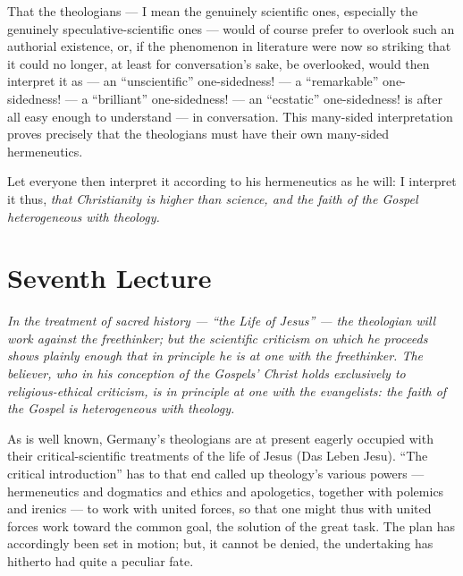 \documentclass[12pt,a4paper]{book}
\begin{document}
That the theologians --- I mean the genuinely scientific ones, especially the genuinely
speculative-scientific ones --- would of course prefer to overlook such an authorial
existence, or, if the phenomenon in literature were now so striking that it could no
longer, at least for conversation's sake, be overlooked, would then interpret it as --- an
``unscientific'' one-sidedness! --- a ``remarkable'' one-sidedness! --- a ``brilliant''
one-sidedness! --- an ``ecstatic'' one-sidedness! is after all easy enough to understand
--- in conversation. This many-sided interpretation proves precisely that the theologians
must have their own many-sided hermeneutics.

Let everyone then interpret it according to his hermeneutics as he will: I interpret it
thus, \emph{that Christianity is higher than science, and the faith of the Gospel
heterogeneous with theology.}

\chapter*{Seventh Lecture}
\label{ch:forel7}

\begin{center}\itshape
In the treatment of sacred history --- ``the Life of Jesus'' --- the
theologian will work against the freethinker; but the scientific criticism
on which he proceeds shows plainly enough that in principle he is at one
with the freethinker. The believer, who in his conception of the Gospels'
Christ holds exclusively to religious-ethical criticism, is in principle at
one with the evangelists: the faith of the Gospel is heterogeneous with
theology.
\end{center}

As is well known, Germany's theologians are at present eagerly occupied with their
critical-scientific treatments of the life of Jesus (Das Leben Jesu). ``The critical
introduction'' has to that end called up theology's various powers --- hermeneutics and
dogmatics and ethics and apologetics, together with polemics and irenics --- to work with
united forces, so that one might thus with united forces work toward the common goal, the
solution of the great task. The plan has accordingly been set in motion; but, it cannot
be denied, the undertaking has hitherto had quite a peculiar fate.
\end{document}
